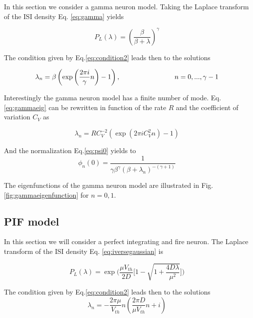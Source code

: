 \documentclass[12pt,twoside]{report}
\begin{document}
In this section we consider a gamma  neuron model. Taking the Laplace transform of the ISI density Eq. \eqref{eq:gamma} yields

\begin{equation}
P_L(\lambda)=\left(\frac{\beta}{\beta +\lambda}\right)^\gamma
\end{equation}

The condition given by Eq.\eqref{eq:condition2} leads then to the solutions

\begin{equation}
\label{eq:gammaeig}
\lambda_n=\beta\left(\exp\left(\frac{2\pi i}{\gamma}n\right)-1\right), \hspace{2.8cm}  n=0,..., \gamma-1
\end{equation}

Interestingly the gamma  neuron model has a finite number of mode. Eq.\eqref{eq:gammaeig} can be rewritten in function of the rate $R$ and the coefficient of variation $C_V$ as

\begin{equation}
\lambda_n=RC_V^{-2}\left(\exp\left(2\pi iC_V^2 n\right)-1\right)
\end{equation}

And the normalization Eq.\ref{eq:psi0} yields to
\begin{equation}
\phi_n(0)=\frac{1}{\gamma\beta^\gamma(\beta+\lambda_n)^{-(\gamma+1)}}
\end{equation}


The eigenfunctions of the gamma  neuron model are illustrated in Fig.\ref{fig:gammaeigenfunction} for $n=0,1$.




\subsection{PIF model}

In this section we will consider a perfect integrating and  fire neuron. The Laplace transform of the ISI density Eq. \eqref{eq:iversegaussian} is

\begin{equation}
P_L(\lambda)=\exp\big(\frac{\mu V_{th}}{2D}\big[1-\sqrt{1+\frac{4D\lambda}{\mu^2}}\big]\big)
\end{equation}


The condition given by Eq.\eqref{eq:condition2} leads then to the solutions
\begin{equation}
\lambda_n=- \frac{2\pi\mu}{V_{th}}n( \frac{2\pi D}{\mu V_{th}}n + i)
\end{equation}
\end{document}
